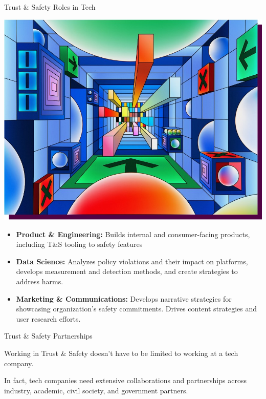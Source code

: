 \documentclass[nobackground,dvipsnames,table]{beamer}
\begin{document}
\begin{frame}{Trust \& Safety Roles in Tech}

\begin{center}
    \includegraphics[width=.55\textwidth]{img/fig13.jpg}
\end{center}
    \footnotesize{
        \begin{itemize} 
            \item \textbf{Product \& Engineering:} Builds internal and consumer-facing products, including T\&S tooling to safety features
            \item \textbf{Data Science:} Analyzes policy violations and their impact on platforms, develops measurement and detection methods, and create strategies to address harms.
            \item \textbf{Marketing \& Communications:} Develops narrative strategies for showcasing organization's safety commitments. Drives content strategies and user research efforts.
        \end{itemize}
    }
\end{frame}



\begin{frame}{Trust \& Safety Partnerships}

Working in Trust \& Safety doesn’t have to be limited to working at a tech company. \newline 

In fact, tech companies need extensive collaborations and partnerships across industry, academic, civil society, and government partners. 


\end{frame}
\end{document}
